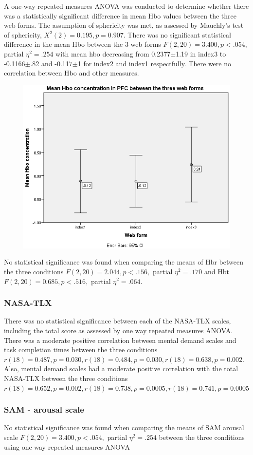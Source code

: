 \documentclass[a4paper]{report}
\begin{document}
			A one-way repeated measures ANOVA was conducted to determine whether there was a statistically significant difference in mean Hbo values between the three web forms. The assumption of sphericity was met, as assessed by Mauchly's test of sphericity, $X^{2}(2) = 0.195, p = 0.907$. There was no significant statistical difference in the mean Hbo between the 3 web forms  $F(2,20)=3.400, p<.054,$ partial $\eta^{2}=.254$ with mean hbo decreasing from 0.2377$\pm$1.19 in index3 to -0.1166$\pm$.82 and -0.117$\pm$1 for index2 and index1 respectfully. There were no correlation between Hbo and other measures.	
						\begin{figure}[h]
							\centering
							\includegraphics[width=0.7\linewidth]{mean-hbo-index123}
							\caption[Mean oxygenated hemoglobin between the three web forms]{}
							\label{fig:mean-hbo-index123}
						\end{figure}
			No statistical significance was found when comparing the means of Hbr between the three conditions $F(2,20)=2.044, p<.156,$ partial $\eta^{2}=.170$ and Hbt $F(2,20)=0.685, p<.516,$ partial $\eta^{2}=.064$.
			\subsubsection{NASA-TLX}
			There was no statistical significance between each of the NASA-TLX scales, including the total score as assessed by one way repeated measures ANOVA.
			There was a moderate positive correlation between mental demand scales and task completion times between the three conditions  $r(18)=0.487, p=0.030,  r(18)=0.484, p=0.030,  r(18)=0.638, p=0.002$. Also, mental demand scales had a moderate positive correlation with the total NASA-TLX between the three conditions $r(18)=0.652, p=0.002,  r(18)=0.738, p=0.0005,  r(18)=0.741, p=0.0005$
			\subsubsection{SAM - arousal scale}
			No statistical significance was found when comparing the means of SAM arousal scale $F(2,20)=3.400, p<.054,$ partial $\eta^{2}=.254$ between the three conditions using one way repeated measures ANOVA
			
\end{document}
